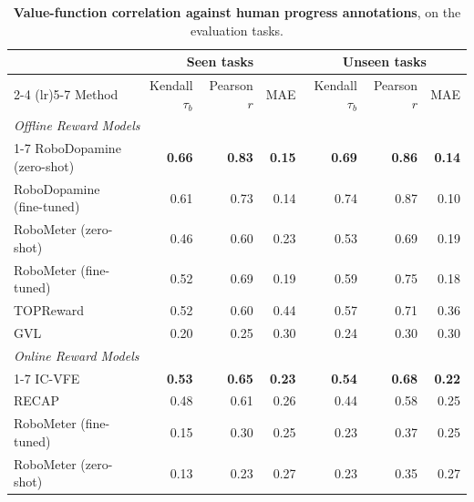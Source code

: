 \begin{table}[t]
    \centering
    \caption{\textbf{Value-function correlation against human progress annotations},
    on the \NumEvalTasks{} evaluation tasks.}
    \label{tab:vfe-retrieval-results}
    \footnotesize
    \begin{tabular}{lrrrrrr}
        \toprule
        & \multicolumn{3}{c}{Seen tasks} & \multicolumn{3}{c}{Unseen tasks} \\
        \cmidrule(lr){2-4} \cmidrule(lr){5-7}
        Method & Kendall $\tau_b$ & Pearson $r$ & MAE & Kendall $\tau_b$ & Pearson $r$ & MAE \\
        \midrule
        \multicolumn{7}{l}{\textit{Offline Reward Models}} \\
        \cmidrule(lr){1-7}
        RoboDopamine (zero-shot)       & \textbf{0.66} & \textbf{0.83} & \textbf{0.15} & \textbf{0.69} & \textbf{0.86} & \textbf{0.14} \\
        RoboDopamine (fine-tuned)      & 0.61 & 0.73 & 0.14 & 0.74 & 0.87 & 0.10 \\
        RoboMeter (zero-shot)          & 0.46 & 0.60 & 0.23 & 0.53 & 0.69 & 0.19 \\
        RoboMeter (fine-tuned)         & 0.52 & 0.69 & 0.19 & 0.59 & 0.75 & 0.18 \\
        TOPReward                      & 0.52 & 0.60 & 0.44 & 0.57 & 0.71 & 0.36 \\
        GVL                            & 0.20 & 0.25 & 0.30 & 0.24 & 0.30 & 0.30 \\
        \multicolumn{7}{l}{\textit{Online Reward Models}} \\
        \cmidrule(lr){1-7}
        IC-VFE         & \textbf{0.53} & \textbf{0.65} & \textbf{0.23} & \textbf{0.54} & \textbf{0.68} & \textbf{0.22} \\
        RECAP             & 0.48 & 0.61 & 0.26 & 0.44 & 0.58 & 0.25 \\
        RoboMeter (fine-tuned) & 0.15 & 0.30 & 0.25 & 0.23 & 0.37 & 0.25 \\
        RoboMeter (zero-shot) & 0.13 & 0.23 & 0.27 & 0.23 & 0.35 & 0.27 \\
        \bottomrule
    \end{tabular}
\end{table}


